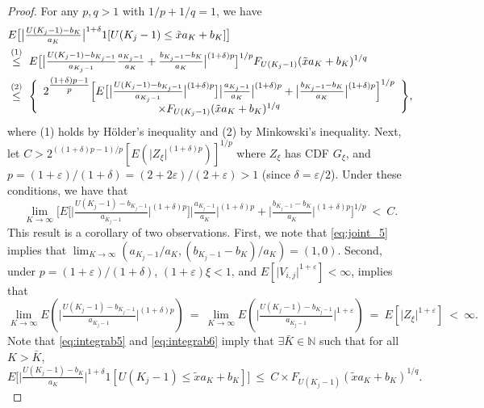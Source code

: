 \begin{proof}
For any $p,q>1$ with $1/p+1/q=1$, we have
\begin{align}
&E\big[ \big\vert \tfrac{U(K_{j}-1)-b_{K}}{ a_{K}}\big\vert ^{1+\delta }1[ U(K_{j}-1)\leq \tilde{x}a_{K}+b_{K}] \big] \notag \\
&\overset{(1)}{\leq }~E\big[ \big\vert \tfrac{U(K_{j}-1)-b_{K_{j}-1}}{a_{K_{j}-1}}\tfrac{a_{K_{j}-1}}{a_{K}}+\tfrac{ b_{K_{j}-1}-b_{K}}{a_{K}}\big\vert ^{( 1+\delta ) p}\big] ^{1/p}F_{U(K_{j}-1)}( \tilde{x}a_{K}+b_{K}) ^{1/q} \nonumber \\
&\overset{(2)}{\leq }~
\Bigg\{\begin{array}{c}
2^{\tfrac{( 1+\delta ) p-1}{p}}\Big[ E\big[ \big\vert \tfrac{U(K_{j}-1)-b_{K_{j}-1}}{ a_{K_{j}-1}}\big\vert ^{( 1+\delta ) p}\big] \big\vert \tfrac{ a_{K_{j}-1}}{a_{K}}\big\vert ^{( 1+\delta ) p}+\big\vert \tfrac{ b_{K_{j}-1}-b_{K}}{a_{K}}\big\vert ^{( 1+\delta ) p}\Big] ^{1/p}\\
\times F_{U(K_{j}-1)}( \tilde{x}a_{K}+b_{K}) ^{1/q}
\end{array}\Bigg\}, \label{eq:integrab5}
\end{align}
where (1) holds by H\"{o}lder's inequality and (2) by Minkowski's inequality. Next, let $C>2^{{(( 1+\delta ) p-1)}/{p}}[ E( \vert Z_{\xi}\vert ^{( 1+\delta ) p}) ] ^{1/p}$ where $Z_{\xi}$ has CDF $G_{\xi }$, and $p= ( 1+\varepsilon ) /( 1+\delta ) =( 2+2\varepsilon ) /( 2+\varepsilon )>1 $ (since $\delta =\varepsilon /2$). Under these conditions, we have that
\begin{equation}
\lim_{K\to \infty }\Big[ E\big[ \big\vert \tfrac{U(K_{j}-1)-b_{K_{j}-1}}{ a_{K_{j}-1}}\big\vert ^{( 1+\delta ) p}\big] \big\vert \tfrac{ a_{K_{j}-1}}{a_{K}}\big\vert ^{( 1+\delta ) p}+\big\vert \tfrac{ b_{K_{j}-1}-b_{K}}{a_{K}}\big\vert ^{( 1+\delta ) p}\Big] ^{1/p}~<~C. \label{eq:integrab6}
\end{equation}
This result is a corollary of two observations. First, we note that \eqref{eq:joint_5} implies that $\lim_{K \to \infty}(a_{K_{j}-1}/a_{K},( b_{K_{j}-1}-b_{K}) /a_{K}) = (1,0)$. Second, under $p= ( 1+\varepsilon ) /( 1+\delta )$, $(1+\varepsilon )\xi <1$, and $E[ \vert V_{i,j}\vert ^{1+\varepsilon }] <\infty $,  \citet[Theorem 5.3.1]{dehaan2006book} implies that
\begin{equation*}
 \lim_{K \to \infty} E( \vert \tfrac{U(K_{j}-1)-b_{K_{j}-1}}{ a_{K_{j}-1}}\vert ^{( 1+\delta ) p}) ~=~ \lim_{K \to \infty} E( \vert \tfrac{U(K_{j}-1)-b_{K_{j}-1}}{ a_{K_{j}-1}}\vert ^{1+\varepsilon}) ~=~ E[ \vert Z_{\xi}\vert ^{1+\varepsilon }] ~<~\infty .
\end{equation*}
Note that \eqref{eq:integrab5} and \eqref{eq:integrab6} imply that $\exists \bar{K}\in \mathbb{N} $ such that for all $K>\bar{K}$,
\begin{equation}
E\big[ \big\vert \tfrac{U(K_{j}-1)-b_{K}}{ a_{K}}\big\vert ^{1+\delta }1[ U(K_{j}-1)\leq \tilde{x}a_{K}+b_{K}] \big] ~\leq~ C \times F_{U(K_{j}-1)}( \tilde{x}a_{K}+b_{K}) ^{1/q}. \label{eq:integrab7}
\end{equation}


\end{proof}
